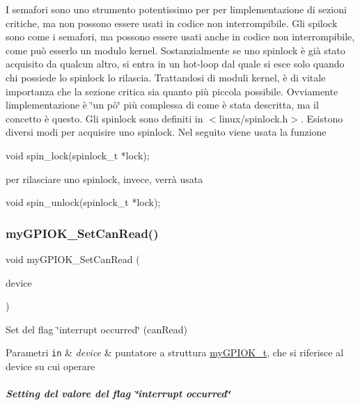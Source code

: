 I semafori sono uno strumento potentissimo per per l\textquotesingle{}implementazione di sezioni critiche, ma non possono essere usati in codice non interrompibile. Gli spilock sono come i semafori, ma possono essere usati anche in codice non interrompibile, come può esserlo un modulo kernel. Sostanzialmente se uno spinlock è già stato acquisito da qualcun altro, si entra in un hot-\/loop dal quale si esce solo quando chi possiede lo spinlock lo rilascia. Trattandosi di moduli kernel, è di vitale importanza che la sezione critica sia quanto più piccola possibile. Ovviamente l\textquotesingle{}implementazione è \char`\"{}un pò\char`\"{} più complessa di come è stata descritta, ma il concetto è questo. Gli spinlock sono definiti in $<$linux/spinlock.\+h$>$. Esistono diversi modi per acquisire uno spinlock. Nel seguito viene usata la funzione 
\begin{DoxyCode}
\textcolor{keywordtype}{void} spin\_lock(spinlock\_t *lock);
\end{DoxyCode}
 per rilasciare uno spinlock, invece, verrà usata 
\begin{DoxyCode}
\textcolor{keywordtype}{void} spin\_unlock(spinlock\_t *lock);
\end{DoxyCode}
 \mbox{\label{group__my_g_p_i_o_k__t_gad82c1051e6acb335b1b26ab0c459453b}} 
\subsubsection{\texorpdfstring{my\+G\+P\+I\+O\+K\+\_\+\+Set\+Can\+Read()}{myGPIOK\_SetCanRead()}}
{\footnotesize\ttfamily void my\+G\+P\+I\+O\+K\+\_\+\+Set\+Can\+Read (\begin{DoxyParamCaption}\item[{\hyperlink{structmy_g_p_i_o_k__t}{my\+G\+P\+I\+O\+K\+\_\+t} $\ast$}]{device }\end{DoxyParamCaption})}



Set del flag \char`\"{}interrupt occurred\char`\"{} (can\+Read) 


\begin{DoxyParams}[1]{Parametri}
\mbox{\tt in}  & {\em device} & puntatore a struttura \hyperlink{structmy_g_p_i_o_k__t}{my\+G\+P\+I\+O\+K\+\_\+t}, che si riferisce al device su cui operare\\
\hline
\end{DoxyParams}
\subparagraph*{Setting del valore del flag \char`\"{}interrupt occurred\char`\"{}}

